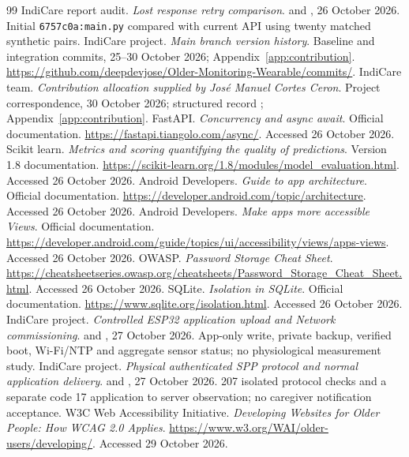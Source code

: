\begin{thebibliography}{99}
 IndiCare report audit. \emph{Lost response retry comparison}.  and , 26 October 2026. Initial \texttt{6757c0a:main.py} compared with current API using twenty matched synthetic pairs.
 IndiCare project. \emph{Main branch version history}. Baseline and integration commits, 25--30 October 2026; Appendix~\ref{app:contribution}. \url{https://github.com/deepdevjose/Older-Monitoring-Wearable/commits/}.
 IndiCare team. \emph{Contribution allocation supplied by Jos\'e Manuel Cortes Ceron}. Project correspondence, 30 October 2026; structured record ; Appendix~\ref{app:contribution}.
 FastAPI. \emph{Concurrency and async await}. Official documentation. \url{https://fastapi.tiangolo.com/async/}. Accessed 26 October 2026.
 Scikit learn. \emph{Metrics and scoring quantifying the quality of predictions}. Version 1.8 documentation. \url{https://scikit-learn.org/1.8/modules/model_evaluation.html}. Accessed 26 October 2026.
 Android Developers. \emph{Guide to app architecture}. Official documentation. \url{https://developer.android.com/topic/architecture}. Accessed 26 October 2026.
 Android Developers. \emph{Make apps more accessible Views}. Official documentation. \url{https://developer.android.com/guide/topics/ui/accessibility/views/apps-views}. Accessed 26 October 2026.
 OWASP. \emph{Password Storage Cheat Sheet}. \url{https://cheatsheetseries.owasp.org/cheatsheets/Password_Storage_Cheat_Sheet.html}. Accessed 26 October 2026.
 SQLite. \emph{Isolation in SQLite}. Official documentation. \url{https://www.sqlite.org/isolation.html}. Accessed 26 October 2026.
 IndiCare project. \emph{Controlled ESP32 application upload and Network commissioning}.  and , 27 October 2026. App-only write, private backup, verified boot, Wi-Fi/NTP and aggregate sensor status; no physiological measurement study.
 IndiCare project. \emph{Physical authenticated SPP protocol and normal application delivery}.  and , 27 October 2026. 207 isolated protocol checks and a separate code 17 application to server observation; no caregiver notification acceptance.
 W3C Web Accessibility Initiative. \emph{Developing Websites for Older People: How WCAG 2.0 Applies}. \url{https://www.w3.org/WAI/older-users/developing/}. Accessed 29 October 2026.

\end{thebibliography}
